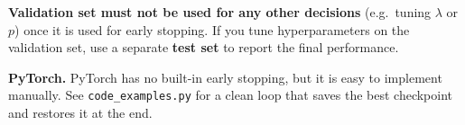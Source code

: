 \documentclass[12pt, a4paper]{article}
\theoremstyle{definition}
\begin{document}
\begin{warnbox}
\textbf{Validation set must not be used for any other decisions}
(e.g.\ tuning $\lambda$ or $p$) once it is used for early stopping.
If you tune hyperparameters on the validation set, use a separate
\textbf{test set} to report the final performance.
\end{warnbox}

\begin{notebox}
\textbf{PyTorch.}
PyTorch has no built-in early stopping, but it is easy to implement
manually.  See \texttt{code\_examples.py} for a clean loop that saves
the best checkpoint and restores it at the end.
\end{notebox}
\end{document}
